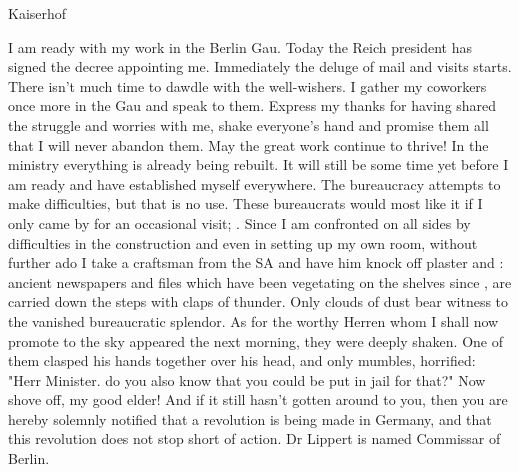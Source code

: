 Kaiserhof

I am ready with my work in the Berlin Gau. Today the Reich president has signed the decree appointing me. Immediately the deluge of mail and visits starts. There isn't much time to dawdle with the well-wishers. I gather my coworkers once more in the Gau and speak to them. Express my thanks for having shared the struggle and worries with me, shake everyone's hand and promise them all that I will never abandon them. May the great work continue to thrive! In the ministry everything is already being rebuilt. It will still be some time yet before I am ready and have established myself everywhere. The bureaucracy attempts to make difficulties, but that is no use. These bureaucrats would most like it if I only came by for an occasional visit; . Since I am confronted on all sides by difficulties in the construction and even in setting up my own room, without further ado I take a craftsman from the SA and have him knock off plaster and : ancient newspapers and files which have been vegetating on the shelves since , are carried down the steps with claps of thunder. Only clouds of dust bear witness to the vanished bureaucratic splendor. As for the worthy Herren whom I shall now promote to the sky appeared the next morning, they were deeply shaken. One of them clasped his hands together over his head, and only mumbles, horrified: "Herr Minister. do you also know that you could be put in jail for that?" Now shove off, my good elder! And if it still hasn't gotten around to you, then you are hereby solemnly notified that a revolution is being made in Germany, and that this revolution does not stop short of action. Dr Lippert is named Commissar of Berlin.
